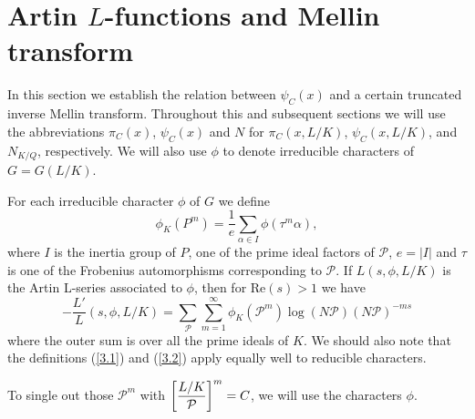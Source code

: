\documentclass[./main]{subfiles}
\begin{document}
\section{Artin \texorpdfstring{$L$}{L}-functions and Mellin transform}

In this section we establish the relation between $\psi_C(x)$ and a certain truncated inverse Mellin transform. Throughout this and subsequent sections we will use the abbreviations $\pi_C(x)$, $\psi_C(x)$ and $N$ for $\pi_C(x, L/K)$, $\psi_C(x, L/K)$, and $N_{K/Q}$, respectively. We will also use $\phi$ to denote irreducible characters of $G=G(L/K)$.

For each irreducible character $\phi$ of $G$ we define
\[\tag{3.1}\label{3.1}
\phi_K(P^m)=\frac{1}{e}\sum_{\alpha \in I} \phi(\tau^m\alpha),\]
where $I$ is the inertia group of $P$, one of the prime ideal factors of $\mathcal P$, $e=|I|$ and $\tau$ is one of the Frobenius automorphisms corresponding to $\mathcal P$. If $L(s, \phi, L/K)$ is the Artin L-series associated to $\phi$, then for $\text{Re}(s)>1$ we have
\[\tag{3.2}\label{3.2}
-\frac{L'}{L}(s, \phi, L/K)=\sum_\mathcal{P} \sum_{m=1}^\infty \phi_K(\mathcal{P}^m)\log (N \mathcal{P})(N\mathcal{P})^{-ms}\]
where the outer sum is over all the prime ideals of $K$. We should also note that the definitions (\ref{3.1}) and (\ref{3.2}) apply equally well to reducible characters.

To single out those $\mathcal{P}^m$ with $\bigg[\dfrac{L/K}{\mathcal{P}}\bigg]^m=C$, we will use the characters $\phi$.
\end{document}
